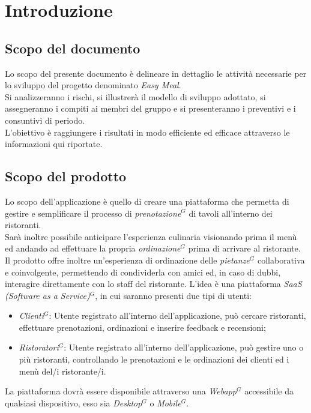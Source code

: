 \nonstopmode
\section{Introduzione}
\subsection{Scopo del documento}
Lo scopo del presente documento è delineare in dettaglio le attività necessarie per lo sviluppo del progetto denominato \emph{Easy Meal}.\\
Si analizzeranno i rischi, si illustrerà il modello di sviluppo adottato, si assegneranno i compiti ai membri del gruppo e si presenteranno i preventivi e i consuntivi di periodo.\\
L'obiettivo è raggiungere i risultati in modo efficiente ed efficace attraverso le informazioni qui riportate.
\subsection{Scopo del prodotto}
Lo scopo dell'applicazione è quello di creare una piattaforma che permetta di gestire e semplificare
il processo di \emph{prenotazione}$^{G}$ di tavoli all'interno dei ristoranti. \\
Sarà inoltre possibile anticipare l'esperienza culinaria visionando prima il menù ed
andando ad effettuare la propria \emph{ordinazione}$^{G}$ prima di arrivare al ristorante. \\
Il prodotto offre inoltre un’esperienza di ordinazione delle \emph{pietanze}$^{G}$ collaborativa e coinvolgente,
permettendo di condividerla con amici ed, in caso di dubbi, interagire direttamente con lo staff del ristorante.
L’idea è una piattaforma \emph{SaaS (Software as a Service)}$^{G}$, in cui saranno presenti due tipi di utenti:

\begin{itemize}
\item \emph{Clienti}$^{G}$: Utente registrato all’interno dell’applicazione, può cercare ristoranti, effettuare prenotazioni, ordinazioni e inserire feedback e recensioni;
\item \emph{Ristoratori}$^{G}$: Utente registrato all’interno dell’applicazione, può gestire uno o più ristoranti, controllando le prenotazioni e le ordinazioni dei clienti ed i menù del/i ristorante/i.
\end{itemize}
La piattaforma dovrà essere disponibile attraverso una \emph{Webapp}$^{G}$ accessibile da qualsiasi dispositivo, esso sia \emph{Desktop}$^{G}$ o \emph{Mobile}$^{G}$.

